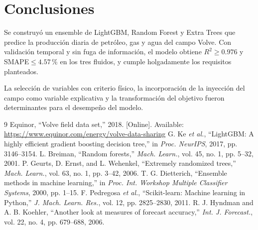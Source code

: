 \documentclass[journal]{IEEEtran}
\begin{document}
\section{Conclusiones}
Se construyó un ensemble de LightGBM, Random Forest y Extra Trees que predice la producción diaria de petróleo, gas y agua del campo Volve. Con validación temporal y sin fuga de información, el modelo obtiene $R^2\geq 0.976$ y SMAPE$\leq 4.57$\,\% en los tres fluidos, y cumple holgadamente los requisitos planteados.

La selección de variables con criterio físico, la incorporación de la inyección del campo como variable explicativa y la transformación del objetivo fueron determinantes para el desempeño del modelo.

\begin{thebibliography}{9}
 Equinor, ``Volve field data set,'' 2018. [Online]. Available: \url{https://www.equinor.com/energy/volve-data-sharing}
 G. Ke \textit{et al.}, ``LightGBM: A highly efficient gradient boosting decision tree,'' in \textit{Proc. NeurIPS}, 2017, pp. 3146--3154.
 L. Breiman, ``Random forests,'' \textit{Mach. Learn.}, vol. 45, no. 1, pp. 5--32, 2001.
 P. Geurts, D. Ernst, and L. Wehenkel, ``Extremely randomized trees,'' \textit{Mach. Learn.}, vol. 63, no. 1, pp. 3--42, 2006.
 T. G. Dietterich, ``Ensemble methods in machine learning,'' in \textit{Proc. Int. Workshop Multiple Classifier Systems}, 2000, pp. 1--15.
 F. Pedregosa \textit{et al.}, ``Scikit-learn: Machine learning in Python,'' \textit{J. Mach. Learn. Res.}, vol. 12, pp. 2825--2830, 2011.
 R. J. Hyndman and A. B. Koehler, ``Another look at measures of forecast accuracy,'' \textit{Int. J. Forecast.}, vol. 22, no. 4, pp. 679--688, 2006.
\end{thebibliography}
\end{document}
